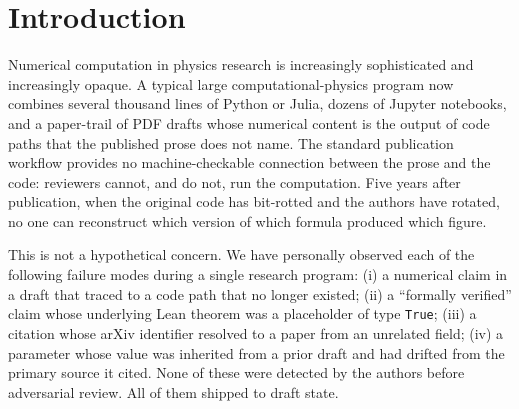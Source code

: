 \documentclass[11pt]{article}
\begin{document}

\section{Introduction}
\label{sec:intro}

Numerical computation in physics research is increasingly
sophisticated and increasingly opaque. A typical large
computational-physics program now combines several thousand lines of
Python or Julia, dozens of Jupyter notebooks, and a paper-trail of
PDF drafts whose numerical content is the output of code paths that
the published prose does not name. The standard publication workflow
provides no machine-checkable connection between the prose and the
code: reviewers cannot, and do not, run the computation. Five years
after publication, when the original code has bit-rotted and the
authors have rotated, no one can reconstruct which version of which
formula produced which figure.

This is not a hypothetical concern. We have personally observed
each of the following failure modes during a single research
program: (i) a numerical claim in a draft that traced to a code
path that no longer existed; (ii) a ``formally verified'' claim
whose underlying Lean theorem was a placeholder of type
\texttt{True}; (iii) a citation whose arXiv identifier resolved to
a paper from an unrelated field; (iv) a parameter whose
value was inherited from a prior draft and had drifted from the
primary source it cited. None of these were detected by the
authors before adversarial review. All of them shipped to draft
state.
\end{document}
